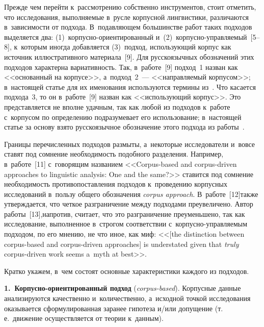 \begin{multicols}{2}
Прежде чем перейти к~рассмотрению собственно инструментов, стоит 
отметить, что исследования, выполняемые в~русле корпусной лингвистики,\linebreak 
различаются в~зависимости от подхода. В~подавляющем большинстве работ 
таких подходов выделяется два: (1)~кор\-пус\-но-ори\-ен\-ти\-ро\-ван\-ный 
и~(2)~кор\-пус\-но-управ\-ля\-емый~[5--8], к~которым иногда \mbox{добавляется} 
(3)~подход, использующий корпус как источник иллюстративного 
материала~[9]. Для русскоязычных обозначений этих подходов характерна 
вариативность. Так, в~работе~[9] подход~1 назван как <<основанный на 
корпусе>>, а~подход~2~--- <<направляемый корпусом>>; в~настоящей 
статье для их именования используются термины из~\cite[с.~14]{8-gon}. Что 
касается подхода~3, то он в~работе~[9] назван как <<использующий 
корпус>>. Это представляется не вполне удачным, так как любой из 
подходов к~работе с~корпусом по определению подразумевает его 
использование; в~настоящей статье за основу взято русскоязычное 
обозначение этого подхода из работы~\cite[с.~399]{10-gon}.

Границы перечисленных подходов размыты, а~некоторые исследователи 
и~вовсе ставят под сомнение необходимость подобного разделения. Например, в~работе~[11] с~говорящим названием <<Corpus-based and corpus-driven 
approaches to linguistic analysis: One and the same?>> ставится под сомнение 
необходимость противопоставления подходов к~проведению корпусных 
исследований в~пользу общего обозначения \textit{corpus approach}. 
В~работе~[12]\linebreak также утверждается, что четкое разграничение между 
подходами преувеличено. Автор работы~[13],\linebreak напротив, считает, что это 
разграничение преуменьшено, так как исследование, выполненное в~строгом 
соответствии с~кор\-пус\-но-управ\-ля\-емым подходом, по его мнению, не 
что иное, как миф: <<[the distinction between corpus-based and corpus-driven 
approaches] is understated given that \textit{truly} corpus-driven work seems 
a~myth at best>>.

Кратко укажем, в~чем состоят основные характеристики каждого из 
подходов.

\textbf{1.~Корпусно-ориентированный подход} (\textit{corpus-based}). 
Корпусные данные анализируются качественно и~количественно, а~исходной 
точкой исследования оказывается сформулированная \mbox{заранее} гипотеза и/или 
допущение (т.\,е.\ движение осуществляется от теории к~данным).


\end{multicols}
